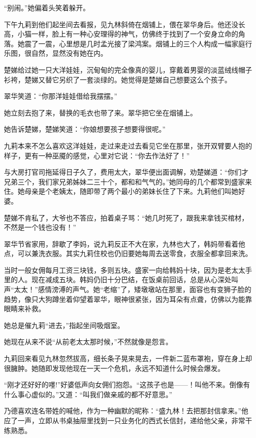 \par “别闹。”她偏着头笑着躲开。
\par 下午九莉到他们起坐间去看报，见九林斜倚在烟铺上，偎在翠华身后。他还没长高，小猫一样，脸上有一种心安理得的神气，仿佛终于找到了一个安身立命的角落。她震了一震，心里想是几时孟光接了梁鸿案。烟铺上的三个人构成一幅家庭行乐图，很自然，显然没有她在内。
\par 楚娣给过她一只大洋娃娃，沉甸甸的完全像真的婴儿，穿戴着男婴的淡蓝绒线帽子衫袴，楚娣又替它另织了一套淡绿的。她觉得是楚娣自己想要这么个孩子。
\par 翠华笑道：“你那洋娃娃借给我摆摆。”
\par 她立刻去抱了来，替换的毛衣也带了来。翠华把它坐在烟铺上。
\par 她告诉楚娣，楚娣笑道：“你娘想要孩子想要得很呢。”
\par 九莉本来不怎么喜欢这洋娃娃，走过来走过去看见它坐在那里，张开双臂要人抱的样子，更有一种巫魇的感觉，心里对它说：“你去作法好了！”
\par 与大房打官司拖延得日子久了，费用太大，翠华便出面调解，劝楚娣道：“你们才兄弟三个，我们家兄弟姊妹二三十个，都和和气气的。”她同母的几个都常到盛家来住。她母亲是个老姨太，随即带了两个最小的弟妹长住了下来。九莉他们叫她好婆。
\par 楚娣不肯私了，大爷也不答应，拍着桌子骂：“她几时死了，跟我来拿钱买棺材，不然是一个钱也没有！”
\par 翠华节省家用，辞歇了李妈，说九莉反正不大在家，九林也大了，韩妈带看着他点，可以兼洗衣服。其实九莉住校也仍旧要她每周去送零食，衣服全都拿回来洗。
\par 当时一般女佣每月工资三块钱，多则五块。盛家一向给韩妈十块，因为是老太太手里的人。现在减成五块。韩妈仍旧十分巴结，在饭桌前回话，总是从心深处叫声“太太！”感情滂溥的声气。她“老缩”了，矮墩墩站在那里，面容也有变狮子脸的趋势，像只大狗蹲坐着仰望着翠华，眼神很紧张，因为耳朵有点聋，仿佛以为能靠眼睛来补救。
\par 她总是催九莉“进去，”指起坐间吸烟室。
\par 她现在从来不说“从前老太太那时候，”不然就像是怨言。
\par 九莉回来看见九林忽然拔高，细长条子晃来晃去，一件新二蓝布罩袍，穿在身上却很臃肿。她随即发现他现在一天一个危机，永远不知道什么时候会爆发。
\par “刚才还好好的嚜!”好婆低声向女佣们抱怨。“这孩子也是——！叫他不来。倒像有什么事心虚似的。”又道：“叫我们做亲戚的都不好意思。”
\par 乃德喜欢连名带姓的喊他，作为一种幽默的昵称：“盛九林！去把那封信拿来。”他应了一声，立即从书桌抽屉里找到一只业务化的西式长信封，递给他父亲，非常干练熟悉。

